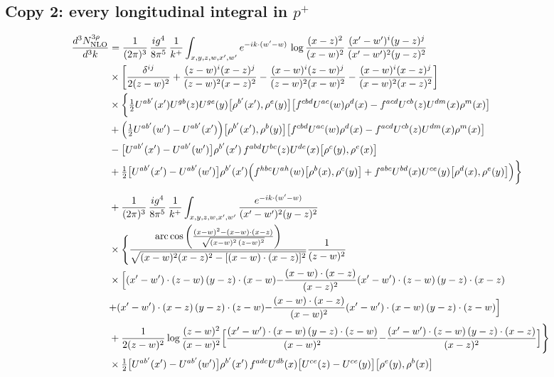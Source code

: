 \documentclass[10pt]{article}
\begin{document}
\subsection*{Copy 2: every longitudinal integral in $p^{+}$}
\begin{align}
\frac{d^{3}N^{3\rho}_{\rm NLO}}{d^{3}k}&=\frac{1}{(2\pi)^{3}}\,\frac{ig^{4}}{8\pi^{5}}\,\frac{1}{k^{+}}\int_{x,y,z,w,x',w'}e^{-ik\cdot(w'-w)}\,\log\frac{(x-z)^{2}}{(x-w)^{2}}\,\frac{(x'-w')^{i}(y-z)^{j}}{(x'-w')^{2}(y-z)^{2}}\notag\\
&\times\bigg[\frac{\delta^{ij}}{2(z-w)^{2}}+\frac{(z-w)^{i}(x-z)^{j}}{(z-w)^{2}(x-z)^{2}}-\frac{(x-w)^{i}(z-w)^{j}}{(z-w)^{2}(x-w)^{2}}-\frac{(x-w)^{i}(x-z)^{j}}{(x-w)^{2}(x-z)^{2}}\bigg]\notag\\
&\times\bigg\{\tfrac12U^{ab'}(x')U^{gb}(z)U^{ge}(y)\big[\rho^{b'}(x'),\rho^{e}(y)\big]\big[f^{cbd}U^{ac}(w)\rho^{d}(x)-f^{acd}U^{cb}(z)U^{dm}(x)\rho^{m}(x)\big]\notag\\
&+\Big(\tfrac12U^{ab'}(w')-U^{ab'}(x')\Big)\big[\rho^{b'}(x'),\rho^{b}(y)\big]\big[f^{cbd}U^{ac}(w)\rho^{d}(x)-f^{acd}U^{cb}(z)U^{dm}(x)\rho^{m}(x)\big]\notag\\
&-\big[U^{ab'}(x')-U^{ab'}(w')\big]\rho^{b'}(x')\,f^{abd}U^{bc}(z)U^{de}(x)\big[\rho^{c}(y),\rho^{e}(x)\big]\notag\\
&+\tfrac12\big[U^{ab'}(x')-U^{ab'}(w')\big]\rho^{b'}(x')\Big(f^{hbc}U^{ah}(w)\big[\rho^{b}(x),\rho^{c}(y)\big]+f^{abc}U^{bd}(x)U^{ce}(y)\big[\rho^{d}(x),\rho^{e}(y)\big]\Big)\bigg\}\notag\\[6pt]
&+\frac{1}{(2\pi)^{3}}\,\frac{ig^{4}}{8\pi^{5}}\,\frac{1}{k^{+}}\int_{x,y,z,w,x',w'}\frac{e^{-ik\cdot(w'-w)}}{(x'-w')^{2}(y-z)^{2}}\notag\\
&\times\Bigg\{\frac{\mathrm{arc\,cos}\left(\frac{(x-w)^{2}-(x-w)\cdot (x-z)}{\sqrt{(x-w)^{2}\,(z-w)^{2}}}\right)}{\sqrt{(x-w)^{2}(x-z)^{2}-[(x-w)\cdot(x-z)]^{2}}}\frac{1}{(z-w)^{2}}\notag\\
&\times\Big[{(x'-w')\cdot(z-w)\,(y-z)\cdot(x-w)}{-\frac{(x-w)\cdot(x-z)}{(x-z)^{2}}(x'-w')\cdot(z-w)\,(y-z)\cdot(x-z)}\notag\\
&{+(x'-w')\cdot(x-z)\,(y-z)\cdot(z-w)}{-\frac{(x-w)\cdot(x-z)}{(x-w)^{2}}(x'-w')\cdot(x-w)\,(y-z)\cdot(z-w)}\Big]\notag\\
&+\frac{1}{2(z-w)^{2}}\log\frac{(z-w)^{2}}{(x-w)^{2}}\Big[{\frac{(x'-w')\cdot(x-w)\,(y-z)\cdot(z-w)}{(x-w)^{2}}}{-\frac{(x'-w')\cdot(z-w)\,(y-z)\cdot(x-z)}{(x-z)^{2}}}\Big]\Bigg\}\notag\\
&\times\tfrac12\big[U^{ab'}(x')-U^{ab'}(w')\big]\rho^{b'}(x')\,f^{adc}U^{db}(x)\big[U^{ce}(z)-U^{ce}(y)\big]\big[\rho^{e}(y),\rho^{b}(x)\big]\notag\\[6pt]

\end{align}
\end{document}
